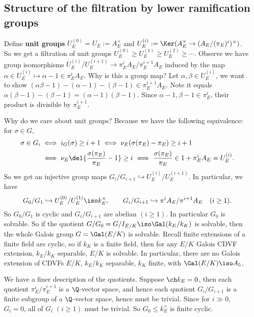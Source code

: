 \documentclass[11pt]{amsart}
\begin{document}
\subsection{Structure of the filtration by lower ramification groups}

Define {\bf unit groups}  $U_E^{(0)} = U_E :=
A_E^{\times}$ and $U_E^{(i)} := \Ker(A_E^{\times} \to
(A_E/(\pi_E)^i)^{\times})$.  So we get a filtration of unit groups $U_E^{(0)}
\geq U_E^{(1)} \geq U_E^{(2)} \geq \cdots$.  Observe we have group isomorphisms
$U_E^{(i)}/U_E^{(i+1)} \to \pi_E^i A_E / \pi_E^{i+1} A_E$ induced by the map
$\alpha \in U_E^{(i)} \mapsto \alpha - 1 \in \pi_E^{i} A_E$.  Why is this a
group map?  Let $\alpha, \beta \in U_E^{(i)}$, we want to show $(\alpha\beta -
1) - (\alpha - 1) - (\beta - 1) \in \pi_E^{i+1} A_E$.  Note it equals $\alpha
(\beta - 1) - (\beta - 1) = (\alpha - 1) (\beta - 1)$.  Since $\alpha - 1, \beta
- 1 \in \pi_E^i$, their product is divisible by $\pi_E^{i+1}$.

\medbreak

Why do we care about unit groups?  Because we have the following equivalence:
for $\sigma \in G$,
\begin{align*}
    \sigma \in G_i
    & \iff i_G(\sigma) \geq i+1 \iff 
    \nu_E(\sigma(\pi_E) - \pi_E) \geq i+1\\
    & \iff \nu_E\del{\frac{\sigma(\pi_E)}{\pi_E} - 1} \geq i
    \iff \frac{\sigma(\pi_E)}{\pi_E} \in 1 + \pi_E^i A_E = U_E^{(i)}.
\end{align*}
So we get an injective group maps $G_i/G_{i+1} \hookrightarrow
U_E^{(i)}/U_E^{(i+1)}$.  In particular, we have
\[
    G_0/G_1 \hookrightarrow U_E^{(0)}/U_E^{(1)} \iso k_E^{\times}, \qquad
    G_i/G_{i+1} \hookrightarrow \pi^i A_E / \pi^{i+1} A_E \quad (i \geq 1).
\]
So $G_0/G_1$ is cyclic and $G_i/G_{i+1}$ are abelian $(i \geq 1)$.  In
particular $G_0$ is solvable.  So if the quotient $G/G_0 = G/I_{E/K} \iso
\Gal(k_E/k_K)$ is solvable, then the whole Galois group $G = \Gal(E/K)$ is
solvable.   Recall finite extensions of a finite field are cyclic, so if $k_K$
is a finite field, then for any $E/K$ Galois CDVF extension, $k_E/k_K$
separable, $E/K$ is solvable.  In particular, there are no Galois extension of
CDVFs $E/K$, $k_E/k_K$ separable, $k_K$ finite, with $\Gal(E/K) \iso A_5$.

\medbreak

We have a finer description of the quotients.  Suppose $\ch k_E = 0$, then each
quotient $\pi_E^{i} / \pi_E^{i+1}$ is a $\Q$-vector space, and hence each
quotient $G_i/G_{i+1}$ is a finite subgroup of a $\Q$-vector space, hence must
be trivial.  Since for $i \gg 0$, $G_i = 0$, all of $G_i$ $(i \geq 1)$ must be
trivial.  So $G_0 \leq k_E^{\times}$ is finite cyclic.
\end{document}

